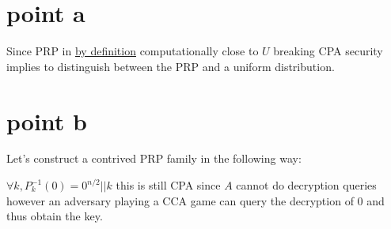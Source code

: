 \section{point a}

Since PRP in \underline{by definition} computationally close to $U$ breaking CPA security implies to distinguish between the PRP and a uniform distribution.


\section{point b}

Let's construct a contrived PRP family in the following way:

$\forall k, P_k^{-1}(0) = 0^{n/2} || k$ this is still CPA since $A$ cannot do decryption queries however an adversary  playing a CCA game can query the decryption of $0$ and thus obtain the key.